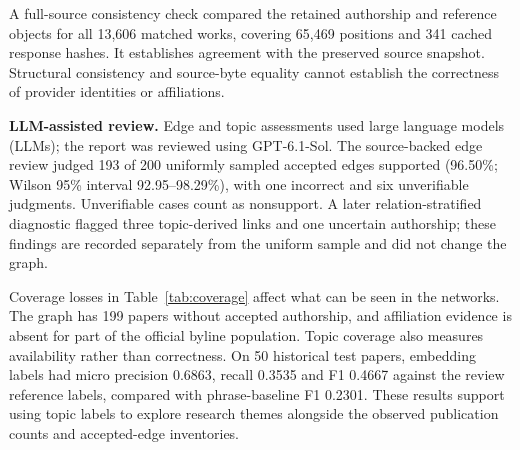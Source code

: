 A full-source consistency check compared the retained authorship and reference
objects for all 13,606 matched works, covering 65,469 positions and 341 cached
response hashes. It establishes agreement with the preserved source snapshot.
Structural consistency and source-byte equality cannot establish the correctness
of provider identities or affiliations.

\textbf{LLM-assisted review.} Edge and topic assessments used large language
models (LLMs); the report was reviewed using GPT-6.1-Sol.
The source-backed edge review judged 193 of 200 uniformly sampled accepted
edges supported (96.50\%; Wilson 95\% interval 92.95--98.29\%), with one
incorrect and six unverifiable judgments. Unverifiable cases count as
nonsupport. A later relation-stratified diagnostic flagged three topic-derived
links and one uncertain authorship; these findings are recorded separately
from the uniform sample and did not change the graph.

Coverage losses in Table~\ref{tab:coverage} affect what can be seen in the
networks. The graph has 199 papers without accepted authorship, and affiliation
evidence is absent for part of the official byline population. Topic coverage
also measures availability rather than correctness. On 50 historical test
papers, embedding labels had micro precision 0.6863, recall 0.3535 and F1 0.4667
against the review reference labels, compared with phrase-baseline F1 0.2301.
These results support using topic labels to explore research themes alongside
the observed publication counts and accepted-edge inventories.
